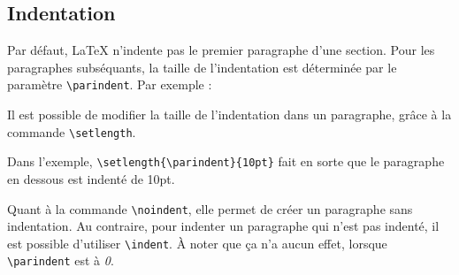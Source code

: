 \subsection{Indentation}

Par défaut, \LaTeX{} n'indente pas le premier paragraphe d'une section.
Pour les paragraphes subséquants, la taille de l'indentation est déterminée par le paramètre \lstinline|\parindent|.
Par exemple :



Il est possible de modifier la taille de l'indentation dans un paragraphe,
grâce à la commande \lstinline|\setlength|.

Dans l'exemple, \lstinline|\setlength{\parindent}{10pt}| fait en sorte que
le paragraphe en dessous est indenté de 10pt.

Quant à la commande \lstinline|\noindent|, elle permet de créer un paragraphe sans indentation.
Au contraire, pour indenter un paragraphe qui n'est pas indenté,
il est possible d'utiliser \lstinline|\indent|.
À noter que ça n'a aucun effet, lorsque \lstinline|\parindent| est à \emph{0}.
